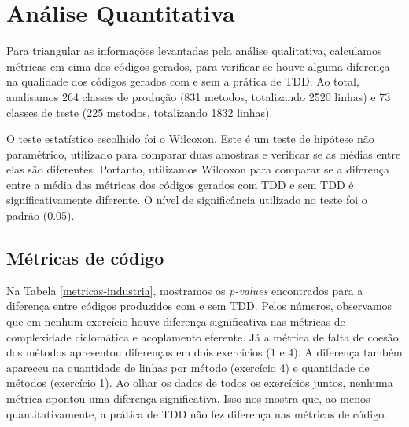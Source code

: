 \documentclass[conference]{IEEEtran}
\begin{document}
\section{Análise Quantitativa}

Para triangular as informações levantadas pela análise qualitativa,
calculamos métricas em cima dos códigos gerados, para verificar se houve
alguma diferença na qualidade dos códigos gerados com e sem a prática de TDD.
Ao total, analisamos
264 classes de produção (831 metodos, totalizando 2520 linhas) e
73 classes de teste (225 metodos, totalizando 1832 linhas).

O teste estatístico escolhido foi o Wilcoxon. Este é um teste de hipótese não paramétrico,
utilizado para comparar duas amostras e verificar se as médias entre elas
são diferentes. Portanto, utilizamos Wilcoxon para comparar se a diferença entre a média
das métricas dos códigos gerados com TDD e sem TDD é significativamente diferente. O
nível de significância utilizado no teste foi o padrão (0.05).


\subsection{Métricas de código}

Na Tabela \ref{metricas-industria}, mostramos os \textit{p-values} encontrados para
a diferença entre códigos produzidos com e sem TDD. 
Pelos números, 
observamos que em nenhum exercício houve diferença significativa nas métricas
de complexidade ciclomática e acoplamento eferente. Já a métrica de falta
de coesão dos métodos apresentou diferenças em dois exercícios (1 e 4). 
A diferença também apareceu na quantidade de linhas por método (exercício 4)
e quantidade de métodos (exercício 1). Ao olhar os dados de todos os exercícios
juntos, nenhuma métrica apontou uma diferença significativa.
Isso nos mostra que, ao menos quantitativamente, a prática de TDD não fez
diferença nas métricas de código.
\end{document}
